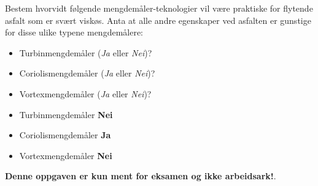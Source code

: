

Bestem hvorvidt følgende mengdemåler-teknologier vil være praktiske for flytende asfalt som er svært viskøs. Anta at alle andre egenskaper ved asfalten er gunstige for disse ulike typene mengdemålere:

\begin{itemize}
\item{} Turbinmengdemåler ({\it Ja} eller {\it Nei})?
\vskip 10pt
\item{} Coriolismengdemåler ({\it Ja} eller {\it Nei})?
\vskip 10pt
\item{} Vortexmengdemåler ({\it Ja} eller {\it Nei})?
\end{itemize}







\begin{itemize}
\item{} Turbinmengdemåler {\bf Nei}
\item{} Coriolismengdemåler {\bf Ja}
\item{} Vortexmengdemåler {\bf Nei}
\end{itemize}







{\bf Denne oppgaven er kun ment for eksamen og ikke arbeidsark!}.

